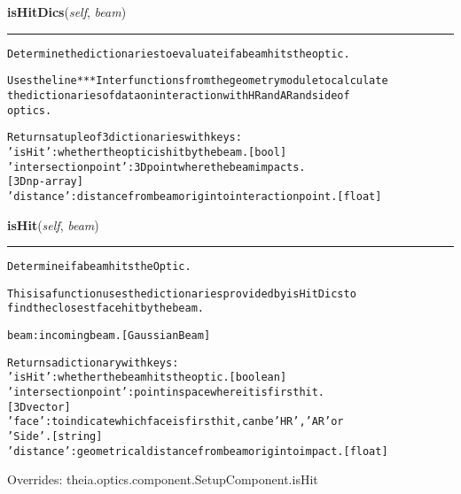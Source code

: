     \label{theia:optics:optic:Optic:isHitDics}

    \vspace{0.5ex}

\hspace{.8\funcindent}\begin{boxedminipage}{\funcwidth}

    \raggedright \textbf{isHitDics}(\textit{self}, \textit{beam})

    \vspace{-1.5ex}

    \rule{\textwidth}{0.5\fboxrule}
\setlength{\parskip}{2ex}
\begin{alltt}
Determine the dictionaries to evaluate if a beam hits the optic.

Uses the line***Inter functions from the geometry module to calculate
the dictionaries of data on interaction with HR and AR and side of
optics.

Returns a tuple of 3 dictionaries with keys:
    'isHit': whether the optic is hit by the beam. [bool]
    'intersection point': 3D point where the beam impacts.
        [3D np-array]
    'distance': distance from beam origin to interaction point. [float]
\end{alltt}

\setlength{\parskip}{1ex}
    \end{boxedminipage}

    \vspace{0.5ex}

\hspace{.8\funcindent}\begin{boxedminipage}{\funcwidth}

    \raggedright \textbf{isHit}(\textit{self}, \textit{beam})

    \vspace{-1.5ex}

    \rule{\textwidth}{0.5\fboxrule}
\setlength{\parskip}{2ex}
\begin{alltt}
Determine if a beam hits the Optic.

This is a function uses the dictionaries provided by isHitDics to
find the closest face hit by the beam.

beam: incoming beam. [GaussianBeam]

Returns a dictionary with keys:
    'isHit': whether the beam hits the optic. [boolean]
    'intersection point': point in space where it is first hit.
            [3D vector]
    'face': to indicate which face is first hit, can be 'HR', 'AR' or
        'Side'. [string]
    'distance': geometrical distance from beam origin to impact. [float]
\end{alltt}

\setlength{\parskip}{1ex}
      Overrides: theia.optics.component.SetupComponent.isHit

    \end{boxedminipage}

